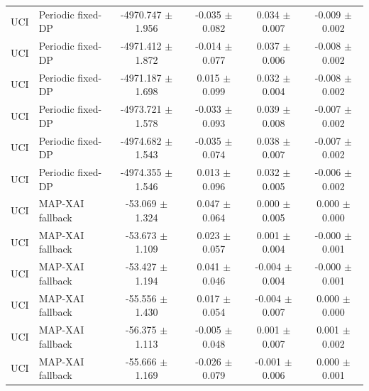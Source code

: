 \begin{table}[t]
\begin{tabular}{llcccc}
UCI & Periodic fixed-DP & -4970.747 $\pm$ 1.956 & -0.035 $\pm$ 0.082 & 0.034 $\pm$ 0.007 & -0.009 $\pm$ 0.002 \\
UCI & Periodic fixed-DP & -4971.412 $\pm$ 1.872 & -0.014 $\pm$ 0.077 & 0.037 $\pm$ 0.006 & -0.008 $\pm$ 0.002 \\
UCI & Periodic fixed-DP & -4971.187 $\pm$ 1.698 & 0.015 $\pm$ 0.099 & 0.032 $\pm$ 0.004 & -0.008 $\pm$ 0.002 \\
UCI & Periodic fixed-DP & -4973.721 $\pm$ 1.578 & -0.033 $\pm$ 0.093 & 0.039 $\pm$ 0.008 & -0.007 $\pm$ 0.002 \\
UCI & Periodic fixed-DP & -4974.682 $\pm$ 1.543 & -0.035 $\pm$ 0.074 & 0.038 $\pm$ 0.007 & -0.007 $\pm$ 0.002 \\
UCI & Periodic fixed-DP & -4974.355 $\pm$ 1.546 & 0.013 $\pm$ 0.096 & 0.032 $\pm$ 0.005 & -0.006 $\pm$ 0.002 \\
UCI & MAP-XAI fallback & -53.069 $\pm$ 1.324 & 0.047 $\pm$ 0.064 & 0.000 $\pm$ 0.005 & 0.000 $\pm$ 0.000 \\
UCI & MAP-XAI fallback & -53.673 $\pm$ 1.109 & 0.023 $\pm$ 0.057 & 0.001 $\pm$ 0.004 & -0.000 $\pm$ 0.001 \\
UCI & MAP-XAI fallback & -53.427 $\pm$ 1.194 & 0.041 $\pm$ 0.046 & -0.004 $\pm$ 0.004 & -0.000 $\pm$ 0.001 \\
UCI & MAP-XAI fallback & -55.556 $\pm$ 1.430 & 0.017 $\pm$ 0.054 & -0.004 $\pm$ 0.007 & 0.000 $\pm$ 0.000 \\
UCI & MAP-XAI fallback & -56.375 $\pm$ 1.113 & -0.005 $\pm$ 0.048 & 0.001 $\pm$ 0.007 & 0.001 $\pm$ 0.002 \\
UCI & MAP-XAI fallback & -55.666 $\pm$ 1.169 & -0.026 $\pm$ 0.079 & -0.001 $\pm$ 0.006 & 0.000 $\pm$ 0.001 \\
\bottomrule
\end{tabular}
\end{table}

